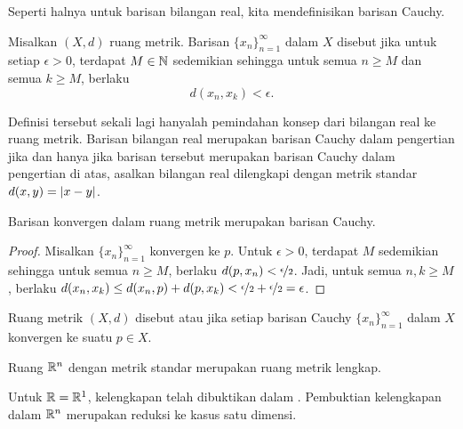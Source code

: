 Seperti halnya untuk barisan bilangan real, kita mendefinisikan barisan Cauchy.

\begin{defn}
Misalkan $(X,d)$ ruang metrik.
Barisan $\{ x_n \}_{n=1}^\infty$ dalam $X$ disebut \emph{} jika
untuk setiap $\epsilon > 0$, terdapat $M \in {\mathbb{N}}$ sedemikian sehingga
untuk semua $n \geq M$ dan semua $k \geq M$, berlaku
\begin{equation*}
d(x_n, x_k) < \epsilon .
\end{equation*}
\end{defn}

Definisi tersebut sekali lagi hanyalah pemindahan konsep
dari bilangan real ke ruang metrik.  Barisan bilangan
real merupakan barisan Cauchy dalam pengertian  jika dan hanya jika
barisan tersebut merupakan barisan Cauchy dalam pengertian di atas, asalkan bilangan real dilengkapi dengan
metrik standar $d(x,y) = \lvert {x-y} \rvert$.

\begin{prop}
Barisan konvergen dalam ruang metrik merupakan barisan Cauchy.
\end{prop}

\begin{proof}
Misalkan $\{ x_n \}_{n=1}^\infty$ konvergen ke $p$.
Untuk $\epsilon > 0$, terdapat $M$ sedemikian sehingga untuk semua $n \geq M$,
berlaku $d(p,x_n) < \nicefrac{\epsilon}{2}$.  Jadi,
untuk semua $n,k \geq M$, berlaku
$d(x_n,x_k) \leq d(x_n,p) + d(p,x_k) < \nicefrac{\epsilon}{2} +
\nicefrac{\epsilon}{2} = \epsilon$.
\end{proof}

\begin{defn}
Ruang metrik $(X,d)$ disebut
\emph{} atau \emph{}
jika setiap barisan Cauchy $\{ x_n \}_{n=1}^\infty$ dalam $X$
konvergen ke suatu $p \in X$.
\end{defn}

\begin{prop}
Ruang ${\mathbb{R}}^n$ dengan metrik standar merupakan ruang metrik lengkap.
\end{prop}

Untuk ${\mathbb{R}} = {\mathbb{R}}^1$, kelengkapan telah dibuktikan dalam .
Pembuktian kelengkapan dalam ${\mathbb{R}}^n$
merupakan reduksi ke kasus satu dimensi.

